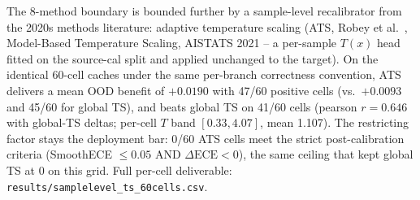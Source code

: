 \documentclass[review,12pt,nonatbib]{elsarticle}
\begin{document}
\begin{table}[t]
\centering
\caption{Architecture robustness for TS: InceptionTime vs.\ ResNet1D
across 6 transfer pairs, full 5-seed coverage on both architectures.
Architecture robustness is supported on both InceptionTime (24/30, 80.0\%)
and ResNet1D (21/30, 70.0\%) with complete 5-seed coverage on all 6
directions. ResNet1D shows direction-specific deficits on
CPSC$\rightarrow$Chapman and CPSC$\rightarrow$PTB-XL (3/5 each) and
PTB-XL$\rightarrow$CPSC (2/5), not
a global architecture deficit.}
\label{tab:arch_robust}
\end{table}

The 8-method boundary is bounded further by a sample-level recalibrator
from the 2020s methods literature: adaptive temperature scaling
(ATS, Robey et al.~\cite{robey2021adaptive}, Model-Based Temperature
Scaling, AISTATS 2021 -- a per-sample $T(x)$ head fitted on the
source-cal split and applied unchanged to the target). On the identical
60-cell caches under the same per-branch correctness convention, ATS
delivers a mean OOD benefit of $+0.0190$ with 47/60 positive cells
(vs.\ $+0.0093$ and 45/60 for global TS), and beats global TS on 41/60
cells (pearson $r=0.646$ with global-TS deltas; per-cell $T$ band
$[0.33, 4.07]$, mean 1.107). The restricting factor stays the
deployment bar: 0/60 ATS cells meet the strict post-calibration
criteria (SmoothECE $\leq 0.05$ AND $\Delta\text{ECE}<0$), the same
ceiling that kept global TS at 0 on this grid. Full per-cell
deliverable: \texttt{results/samplelevel\_ts\_60cells.csv}.
\end{document}
